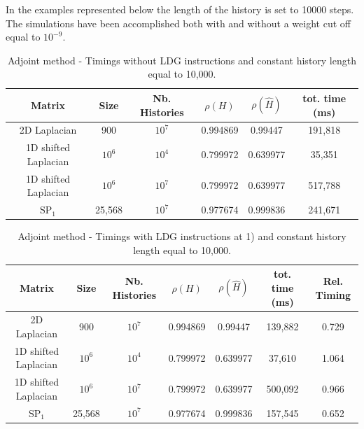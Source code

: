 \documentclass[a4paper,10pt]{article}
\begin{document}
In the examples represented below the length of the history is set to 10000 
steps. The simulations have been accomplished both with and without a weight 
cut off equal to $10^{-9}$.


\begin{table}[!h]
\begin{tabular}{|c|c|c|c|c|c|}
\hline
\textbf{Matrix} & \textbf{Size} &\textbf{Nb. Histories} & $\rho(H)$ 
& $\rho(\hat{H})$ & tot. time (ms)\\
\hline
2D Laplacian& 900 & $10^7$ & 0.994869 & 0.99447 & 191,818 \\
\hline 
1D shifted Laplacian& $10^6$ & $10^4$ & 0.799972 & 0.639977 & 35,351\\
\hline
1D shifted Laplacian& $10^6$ & $10^7$ & 0.799972 & 0.639977 & 517,788\\
\hline
$\text{SP}_1$ & 25,568 & $10^7$ & 0.977674 & 0.999836 & 241,671\\
\hline
\end{tabular}
\caption{Adjoint method - Timings without LDG instructions and constant history 
length equal to 
10,000.}
\label{tab4}
\end{table}


\begin{table}[!h]
\hspace*{-1cm}
\begin{tabular}{|c|c|c|c|c|c|c|}
\hline
\textbf{Matrix} & \textbf{Size} &\textbf{Nb. Histories} & $\rho(H)$ 
& $\rho(\hat{H})$ & tot. time (ms)& Rel. Timing\\
\hline
2D Laplacian& 900 & $10^7$ & 0.994869 & 0.99447 & 139,882 & 0.729\\
\hline 
1D shifted Laplacian& $10^6$ & $10^4$ & 0.799972 & 0.639977 & 37,610 & 1.064\\
\hline
1D shifted Laplacian& $10^6$ & $10^7$ & 0.799972 & 0.639977 & 500,092 & 0.966\\
\hline
$\text{SP}_1$ & 25,568 & $10^7$ & 0.977674 & 0.999836 & 157,545 & 0.652\\
\hline
\end{tabular}
\caption{Adjoint method - Timings with LDG instructions at 1) and constant 
history length equal 
to 
10,000.}
\label{tab5}
\end{table}
\end{document}
